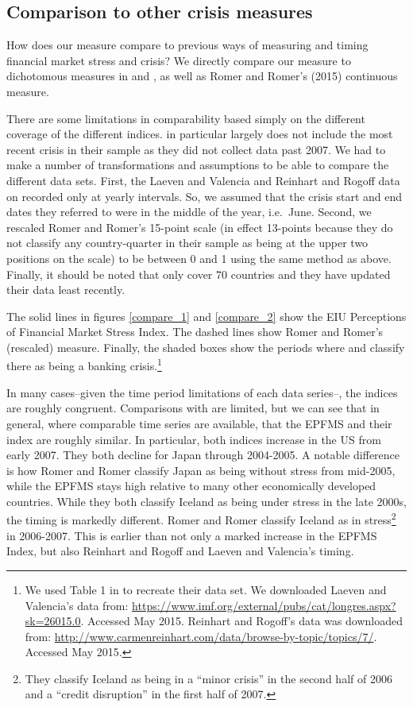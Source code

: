 \documentclass[]{article}
\begin{document}
\subsection{Comparison to other crisis
measures}\label{comparison-to-other-crisis-measures}

How does our measure compare to previous ways of measuring and timing
financial market stress and crisis? We directly compare our measure to
dichotomous measures in \cite{Reinhart2009} and \cite{laeven2013}, as well as Romer and Romer's (2015) continuous measure.

There are some limitations in comparability based simply on the
different coverage of the different indices. \cite{Romer2015}
in particular largely does not include the most recent crisis in their
sample as they did not collect data past 2007. We had to make a number
of transformations and assumptions to be able to compare the different
data sets. First, the Laeven and Valencia and Reinhart and Rogoff data
on recorded only at yearly intervals. So, we assumed that the crisis
start and end dates they referred to were in the middle of the year,
i.e.~June. Second, we rescaled Romer and Romer's 15-point scale (in
effect 13-points because they do not classify any country-quarter in
their sample as being at the upper two positions on the scale) to be
between 0 and 1 using the same method as above. Finally, it should be
noted that \cite{Reinhart2009} only cover 70 countries and they
have updated their data least recently.

The solid lines in figures \ref{compare_1} and \ref{compare_2} show the
EIU Perceptions of Financial Market Stress Index. The dashed lines show
Romer and Romer's (rescaled) measure. Finally, the shaded boxes show the
periods where \cite{laeven2013} and \cite{Reinhart2009} classify there as being a banking crisis.\footnote{We used Table 1 in \cite{Romer2015} to recreate their data set. We downloaded Laeven and Valencia's data from: \url{https://www.imf.org/external/pubs/cat/longres.aspx?sk=26015.0}.
  Accessed May 2015. Reinhart and Rogoff's data was downloaded from:
  \url{http://www.carmenreinhart.com/data/browse-by-topic/topics/7/}.
  Accessed May 2015.}

In many cases--given the time period limitations of each data series--,
the indices are roughly congruent. Comparisons with \cite{Romer2015} are limited, but we can see that in general, where comparable time series are available, that the EPFMS and their index are roughly similar. In particular, both indices increase in the US from early 2007.
They both decline for Japan through 2004-2005. A notable difference is
how Romer and Romer classify Japan as being without stress from
mid-2005, while the EPFMS stays high relative to many other economically
developed countries. While they both classify Iceland as being under
stress in the late 2000s, the timing is markedly different. Romer and
Romer classify Iceland as in stress\footnote{They classify Iceland as
  being in a ``minor crisis'' in the second half of 2006 and a ``credit
  disruption'' in the first half of 2007.} in 2006-2007. This is earlier
than not only a marked increase in the EPFMS Index, but also Reinhart
and Rogoff and Laeven and Valencia's timing.
\end{document}
